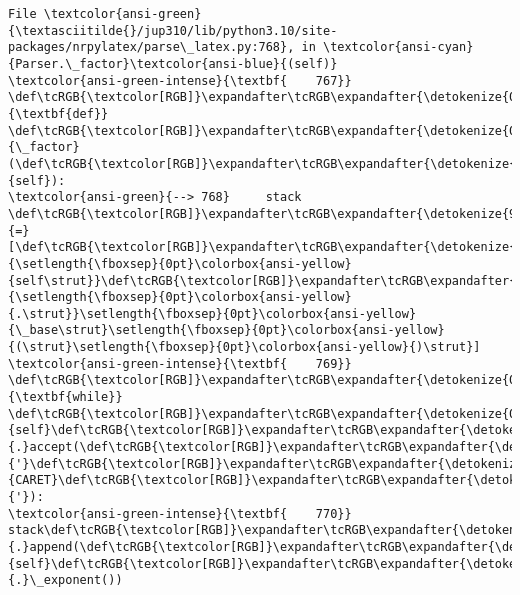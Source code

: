 \documentclass[landscape,letterpaper,10pt,english]{article}
\begin{document}
\begin{Verbatim}[commandchars=\\\{\}, frame=single, framerule=2mm, rulecolor=\color{outerrorbackground}]
File \textcolor{ansi-green}{\textasciitilde{}/jup310/lib/python3.10/site-packages/nrpylatex/parse\_latex.py:768}, in \textcolor{ansi-cyan}{Parser.\_factor}\textcolor{ansi-blue}{(self)}
\textcolor{ansi-green-intense}{\textbf{    767}} \def\tcRGB{\textcolor[RGB]}\expandafter\tcRGB\expandafter{\detokenize{0,135,0}}{\textbf{def}} \def\tcRGB{\textcolor[RGB]}\expandafter\tcRGB\expandafter{\detokenize{0,0,255}}{\_factor}(\def\tcRGB{\textcolor[RGB]}\expandafter\tcRGB\expandafter{\detokenize{0,135,0}}{self}):
\textcolor{ansi-green}{--> 768}     stack \def\tcRGB{\textcolor[RGB]}\expandafter\tcRGB\expandafter{\detokenize{98,98,98}}{=} [\def\tcRGB{\textcolor[RGB]}\expandafter\tcRGB\expandafter{\detokenize{0,135,0}}{\setlength{\fboxsep}{0pt}\colorbox{ansi-yellow}{self\strut}}\def\tcRGB{\textcolor[RGB]}\expandafter\tcRGB\expandafter{\detokenize{98,98,98}}{\setlength{\fboxsep}{0pt}\colorbox{ansi-yellow}{.\strut}}\setlength{\fboxsep}{0pt}\colorbox{ansi-yellow}{\_base\strut}\setlength{\fboxsep}{0pt}\colorbox{ansi-yellow}{(\strut}\setlength{\fboxsep}{0pt}\colorbox{ansi-yellow}{)\strut}]
\textcolor{ansi-green-intense}{\textbf{    769}}     \def\tcRGB{\textcolor[RGB]}\expandafter\tcRGB\expandafter{\detokenize{0,135,0}}{\textbf{while}} \def\tcRGB{\textcolor[RGB]}\expandafter\tcRGB\expandafter{\detokenize{0,135,0}}{self}\def\tcRGB{\textcolor[RGB]}\expandafter\tcRGB\expandafter{\detokenize{98,98,98}}{.}accept(\def\tcRGB{\textcolor[RGB]}\expandafter\tcRGB\expandafter{\detokenize{175,0,0}}{'}\def\tcRGB{\textcolor[RGB]}\expandafter\tcRGB\expandafter{\detokenize{175,0,0}}{CARET}\def\tcRGB{\textcolor[RGB]}\expandafter\tcRGB\expandafter{\detokenize{175,0,0}}{'}):
\textcolor{ansi-green-intense}{\textbf{    770}}         stack\def\tcRGB{\textcolor[RGB]}\expandafter\tcRGB\expandafter{\detokenize{98,98,98}}{.}append(\def\tcRGB{\textcolor[RGB]}\expandafter\tcRGB\expandafter{\detokenize{0,135,0}}{self}\def\tcRGB{\textcolor[RGB]}\expandafter\tcRGB\expandafter{\detokenize{98,98,98}}{.}\_exponent())


\end{Verbatim}
\end{document}
